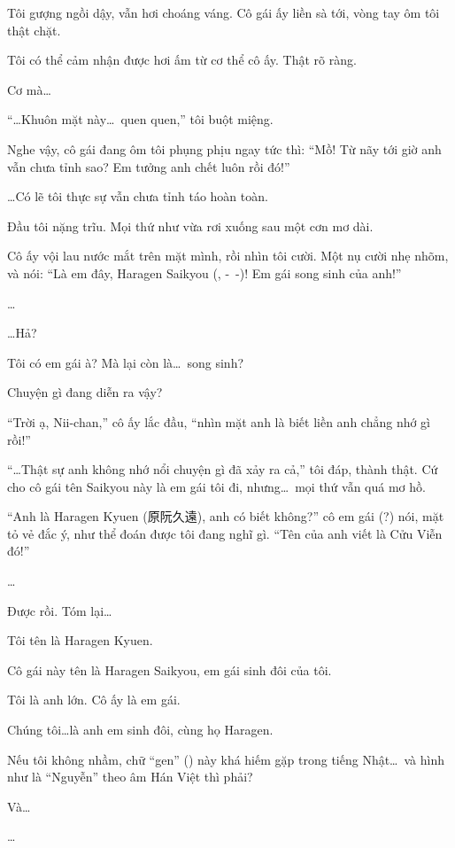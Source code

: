 \documentclass[../main.tex]{subfiles}
\begin{document}
Tôi gượng ngồi dậy, vẫn hơi choáng váng. Cô gái ấy liền sà tới, vòng tay ôm tôi thật chặt.

Tôi có thể cảm nhận được hơi ấm từ cơ thể cô ấy. Thật rõ ràng.

Cơ mà\dots

``\dots Khuôn mặt này\dots\ quen quen,'' tôi buột miệng.

Nghe vậy, cô gái đang ôm tôi phụng phịu ngay tức thì: ``Mồ! Từ nãy tới giờ anh vẫn chưa tỉnh sao? Em tưởng anh chết luôn rồi đó!''

\dots Có lẽ tôi thực sự vẫn chưa tỉnh táo hoàn toàn.

Đầu tôi nặng trĩu. Mọi thứ như vừa rơi xuống sau một cơn mơ dài.

Cô ấy vội lau nước mắt trên mặt mình, rồi nhìn tôi cười. Một nụ cười nhẹ nhõm, và nói: ``Là em đây, Haragen Saikyou (, -\ -)! Em gái song sinh của anh!''

\dots

\dots Hả?

Tôi có em gái à? Mà lại còn là\dots\ song sinh?

Chuyện gì đang diễn ra vậy?

``Trời ạ, Nii-chan,'' cô ấy lắc đầu, ``nhìn mặt anh là biết liền anh chẳng nhớ gì rồi!''

``\dots Thật sự anh không nhớ nổi chuyện gì đã xảy ra cả,'' tôi đáp, thành thật. Cứ cho cô gái tên Saikyou này là em gái tôi đi, nhưng\dots\ mọi thứ vẫn quá mơ hồ.

``Anh là Haragen Kyuen (原阮久遠), anh có biết không?''  cô em gái (?) nói, mặt tỏ vẻ đắc ý, như thể đoán được tôi đang nghĩ gì. ``Tên của anh viết là Cửu Viễn đó!''

\dots

Được rồi. Tóm lại\dots

Tôi tên là Haragen Kyuen.

Cô gái này tên là Haragen Saikyou, em gái sinh đôi của tôi.

Tôi là anh lớn. Cô ấy là em gái.

Chúng tôi\dots là anh em sinh đôi, cùng họ Haragen.

Nếu tôi không nhầm, chữ ``gen'' () này khá hiếm gặp trong tiếng Nhật\dots\ và hình như là ``Nguyễn'' theo âm Hán Việt thì phải?

Và\dots

\dots
\end{document}
